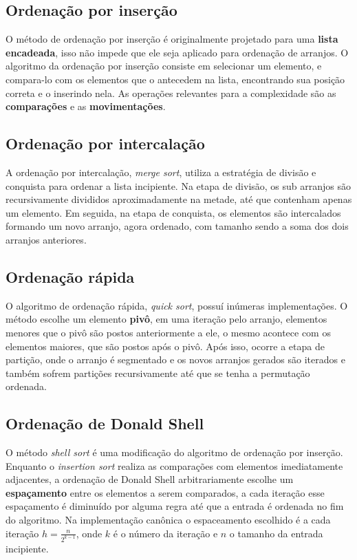 \subsection{Ordenação por inserção}

O método de ordenação por inserção é originalmente projetado para uma \textbf{lista encadeada}, isso não impede que ele seja aplicado para ordenação de arranjos. O algoritmo da ordenação por inserção consiste em selecionar um elemento, e compara-lo com os elementos que o antecedem na lista, encontrando sua posição correta e o inserindo nela. As operações relevantes para a complexidade são as \textbf{comparações} e as \textbf{movimentações}.

\subsection{Ordenação por intercalação}

A ordenação por intercalação, \textit{merge sort}, utiliza a estratégia de divisão e conquista para ordenar a lista incipiente. Na etapa de divisão, os sub arranjos são recursivamente divididos aproximadamente na metade, até que contenham apenas um elemento. Em seguida, na etapa de conquista, os elementos são intercalados formando um novo arranjo, agora ordenado, com tamanho sendo a soma dos dois arranjos anteriores.

\subsection{Ordenação rápida}

O algoritmo de ordenação rápida, \textit{quick sort}, possuí inúmeras implementações. O método escolhe um elemento \textbf{pivô}, em uma iteração pelo arranjo, elementos menores que o pivô são postos anteriormente a ele, o mesmo acontece com os elementos maiores, que são postos após o pivô. Após isso, ocorre a etapa de partição, onde o arranjo é segmentado e os novos arranjos gerados são iterados e também sofrem partições recursivamente até que se tenha a permutação ordenada.

\subsection{Ordenação de Donald Shell}

O método \textit{shell sort} é uma modificação do algoritmo de ordenação por inserção. Enquanto o \textit{insertion sort} realiza as comparações com elementos imediatamente adjacentes, a ordenação de Donald Shell arbitrariamente escolhe um \textbf{espaçamento} entre os elementos a serem comparados, a cada iteração esse espaçamento é diminuído por alguma regra até que a entrada é ordenada no fim do algoritmo. Na implementação canônica o espaceamento escolhido é a cada iteração $h = \frac{n}{2^{k-1}}$, onde $k$ é o número da iteração e $n$ o tamanho da entrada incipiente.

